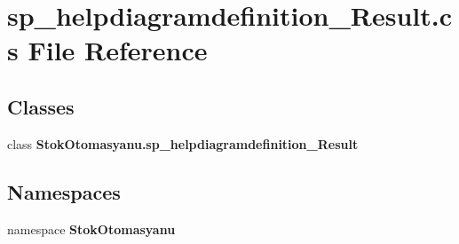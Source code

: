 \section{sp\+\_\+helpdiagramdefinition\+\_\+\+Result.\+cs File Reference}
\label{sp__helpdiagramdefinition___result_8cs}
\subsection*{Classes}
\begin{DoxyCompactItemize}
\item 
class \textbf{ Stok\+Otomasyanu.\+sp\+\_\+helpdiagramdefinition\+\_\+\+Result}
\end{DoxyCompactItemize}
\subsection*{Namespaces}
\begin{DoxyCompactItemize}
\item 
namespace \textbf{ Stok\+Otomasyanu}
\end{DoxyCompactItemize}
